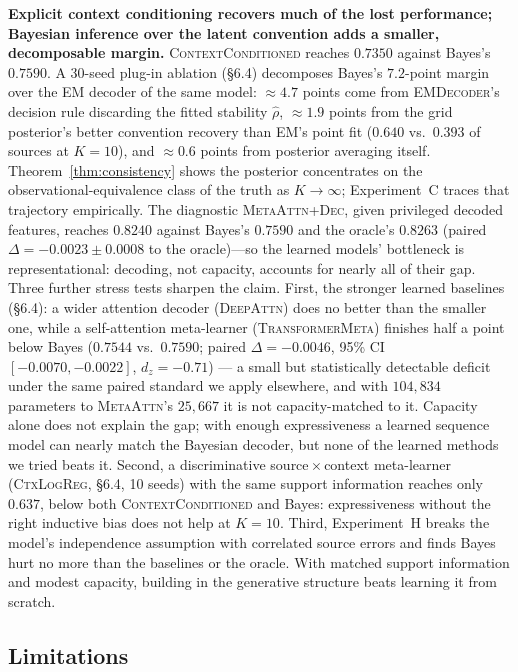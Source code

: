 \textbf{Explicit context conditioning recovers much of the lost
performance; Bayesian inference over the latent convention adds a
smaller, decomposable margin.} \textsc{ContextConditioned} reaches
$0.7350$ against Bayes's $0.7590$. A 30-seed plug-in ablation
(\S6.4) decomposes Bayes's $7.2$-point margin over the EM decoder of
the same model: $\approx 4.7$ points come from \textsc{EMDecoder}'s
decision rule discarding the fitted stability $\hat\rho$,
$\approx 1.9$ points from the grid posterior's better convention
recovery than EM's point fit ($0.640$ vs.\ $0.393$ of sources at
$K=10$), and $\approx 0.6$ points from posterior averaging itself.
Theorem~\ref{thm:consistency} shows the posterior concentrates
on the observational-equivalence class of the truth as $K \to \infty$;
Experiment~C traces that trajectory empirically. The diagnostic
\textsc{MetaAttn+Dec}, given privileged decoded features, reaches $0.8240$
against Bayes's $0.7590$ and the oracle's $0.8263$ (paired
$\Delta = -0.0023 \pm 0.0008$ to the oracle)---so the learned models'
bottleneck is representational: decoding, not capacity, accounts for
nearly all of their gap. Three further stress
tests sharpen the claim. First, the stronger learned baselines
(\S6.4): a wider attention decoder (\textsc{DeepAttn}) does no better
than the smaller one, while a self-attention meta-learner
(\textsc{TransformerMeta}) finishes half a point below Bayes
($0.7544$ vs.\ $0.7590$; paired $\Delta = -0.0046$, 95\% CI
$[-0.0070, -0.0022]$, $d_z = -0.71$) --- a small but statistically
detectable deficit under the same paired standard we apply elsewhere,
and with $104{,}834$ parameters to \textsc{MetaAttn}'s $25{,}667$ it
is not capacity-matched to it. Capacity alone does not explain the
gap; with enough expressiveness a learned sequence model can nearly
match the Bayesian decoder, but none of the learned methods we tried
beats it. Second, a discriminative
source${}\times{}$context meta-learner
(\textsc{CtxLogReg}, \S6.4, 10 seeds) with the same support information reaches
only $0.637$, below both \textsc{ContextConditioned} and Bayes:
expressiveness without the right inductive bias does not help at $K=10$.
Third, Experiment~H breaks the model's independence assumption with
correlated source errors and finds Bayes hurt no more than the baselines
or the oracle. With matched support information and modest capacity,
building in the generative structure beats learning it from scratch.

\subsection{Limitations}

